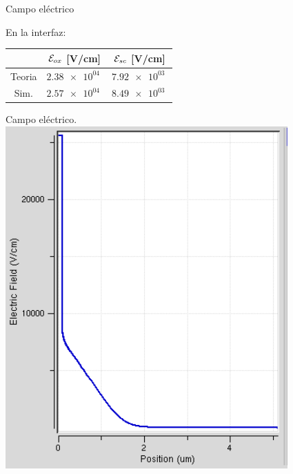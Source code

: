 \documentclass{/home/daniel/GitHub/USC-Physics-Degree-Notes/Notes/Presentacion}
\begin{document}
\begin{frame}{Campo eléctrico}
    \begin{minipage}{0.4\linewidth}
        \begin{center}
            \small
            En la interfaz: 
            \vspace*{1em}

            \begin{tabular}{ccc}
                \toprule
                & $\mathcal{E}_{ox} $ [V/cm] & $\mathcal{E}_{sc} $ [V/cm]   \\ \midrule
                Teoria &  $\SI{2.38e+04}{}$ &  $\SI{7.92e+03}{}$ \\
                Sim. &  $\SI{2.57e+04}{}$ &  $\SI{8.49e+03}{}$  \\
                \bottomrule
            \end{tabular}
        \end{center}
    \end{minipage}
    \hfill
    \begin{minipage}{0.55\linewidth} 
        \centering
        Campo eléctrico.
        \vspace*{1em}
        \includegraphics[width=0.7\linewidth]{../Imagenes/0-Field.png}
    \end{minipage}
\end{frame}

\end{document}
